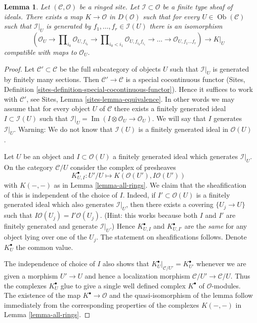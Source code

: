 \documentclass{stacks-project}
\theoremstyle{plain}
\newtheorem{lemma}[subsection]{Lemma}
\theoremstyle{definition}
\theoremstyle{remark}
\numberwithin{equation}{subsection}
\def\Ob{\mathop{\mathrm{Ob}}\nolimits}
\def\Im{\mathop{\mathrm{Im}}}
\begin{document}
\begin{lemma}
\label{lemma-global-extended-cech-complex}
Let $(\mathcal{C}, \mathcal{O})$ be a ringed site. Let
$\mathcal{I} \subset \mathcal{O}$ be a finite type sheaf of ideals.
There exists a map $K \to \mathcal{O}$ in $D(\mathcal{O})$
such that for every $U \in \Ob(\mathcal{C})$ such that
$\mathcal{I}|_U$ is generated by $f_1, \ldots, f_r \in \mathcal{I}(U)$
there is an isomorphism
$$
(\mathcal{O}_U \to \prod\nolimits_{i_0} \mathcal{O}_{U, f_{i_0}} \to
\prod\nolimits_{i_0 < i_1} \mathcal{O}_{U, f_{i_0}f_{i_1}} \to
\ldots \to \mathcal{O}_{U, f_1\ldots f_r}) \longrightarrow K|_U
$$
compatible with maps to $\mathcal{O}_U$.
\end{lemma}

\begin{proof}
Let $\mathcal{C}' \subset \mathcal{C}$ be the full subcategory
of objects $U$ such that $\mathcal{I}|_U$ is generated by
finitely many sections. Then $\mathcal{C}' \to \mathcal{C}$
is a special cocontinuous functor
(Sites, Definition \ref{sites-definition-special-cocontinuous-functor}).
Hence it suffices to work with $\mathcal{C}'$, see
Sites, Lemma \ref{sites-lemma-equivalence}.
In other words we may assume that for every
object $U$ of $\mathcal{C}$ there exists a finitely generated
ideal $I \subset \mathcal{I}(U)$ such that
$\mathcal{I}|_U = \Im(I \otimes \mathcal{O}_U \to \mathcal{O}_U)$.
We will say that $I$ generates $\mathcal{I}|_U$.
Warning: We do not know that $\mathcal{I}(U)$ is a finitely generated
ideal in $\mathcal{O}(U)$.

\medskip\noindent
Let $U$ be an object and $I \subset \mathcal{O}(U)$ a finitely
generated ideal which generates $\mathcal{I}|_U$.
On the category $\mathcal{C}/U$ consider the complex of presheaves
$$
K_{U, I}^\bullet : U'/U \longmapsto K(\mathcal{O}(U'), I\mathcal{O}(U'))
$$
with $K(-, -)$ as in Lemma \ref{lemma-all-rings}.
We claim that the sheafification of this is independent of
the choice of $I$. Indeed, if $I' \subset \mathcal{O}(U)$
is a finitely generated ideal which also generates $\mathcal{I}|_U$, then
there exists a covering $\{U_j \to U\}$ such that
$I\mathcal{O}(U_j) = I'\mathcal{O}(U_j)$. (Hint: this works because
both $I$ and $I'$ are finitely generated and generate $\mathcal{I}|_U$.)
Hence $K_{U, I}^\bullet$ and $K_{U, I'}^\bullet$ are the {\it same}
for any object lying over one of the $U_j$. The statement
on sheafifications follows. Denote $K_U^\bullet$ the common value.

\medskip\noindent
The independence of choice of $I$ also shows that
$K_U^\bullet|_{\mathcal{C}/U'} = K_{U'}^\bullet$
whenever we are given a morphism
$U' \to U$ and hence a localization morphism
$\mathcal{C}/U' \to \mathcal{C}/U$. Thus the complexes
$K_U^\bullet$ glue to give a single well defined complex $K^\bullet$
of $\mathcal{O}$-modules. The existence of the map $K^\bullet \to \mathcal{O}$
and the quasi-isomorphism of the lemma follow immediately from
the corresponding properties of the complexes $K(-, -)$ in
Lemma \ref{lemma-all-rings}.
\end{proof}
\end{document}

